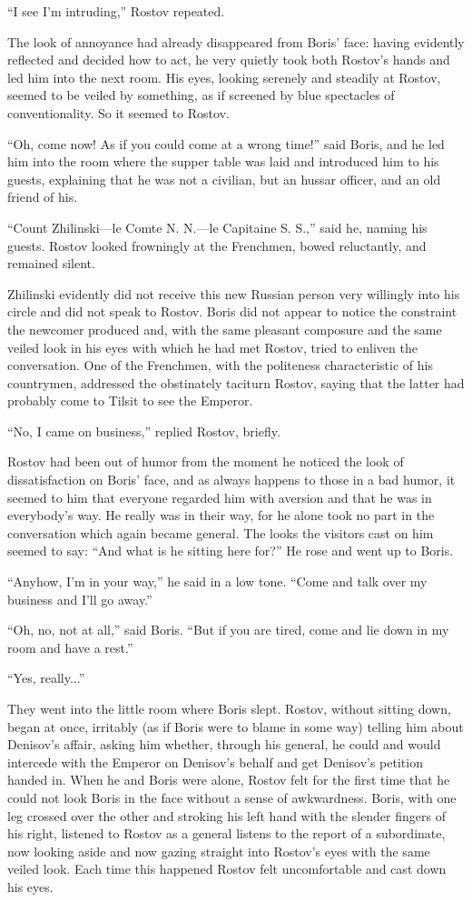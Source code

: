 ``I see I'm intruding,'' Rostov repeated.

The look of annoyance had already disappeared from Boris' face:
having evidently reflected and decided how to act, he very
quietly took both Rostov's hands and led him into the next
room. His eyes, looking serenely and steadily at Rostov, seemed
to be veiled by something, as if screened by blue spectacles of
conventionality. So it seemed to Rostov.

``Oh, come now! As if you could come at a wrong time!'' said
Boris, and he led him into the room where the supper table was
laid and introduced him to his guests, explaining that he was not
a civilian, but an hussar officer, and an old friend of his.

``Count Zhilinski---le Comte N. N.---le Capitaine S. S.,'' said
he, naming his guests. Rostov looked frowningly at the Frenchmen,
bowed reluctantly, and remained silent.

Zhilinski evidently did not receive this new Russian person very
willingly into his circle and did not speak to Rostov. Boris did
not appear to notice the constraint the newcomer produced and,
with the same pleasant composure and the same veiled look in his
eyes with which he had met Rostov, tried to enliven the
conversation. One of the Frenchmen, with the politeness
characteristic of his countrymen, addressed the obstinately
taciturn Rostov, saying that the latter had probably come to
Tilsit to see the Emperor.

``No, I came on business,'' replied Rostov, briefly.

Rostov had been out of humor from the moment he noticed the look
of dissatisfaction on Boris' face, and as always happens to those
in a bad humor, it seemed to him that everyone regarded him with
aversion and that he was in everybody's way. He really was in
their way, for he alone took no part in the conversation which
again became general. The looks the visitors cast on him seemed
to say: ``And what is he sitting here for?'' He rose and went up
to Boris.

``Anyhow, I'm in your way,'' he said in a low tone. ``Come and
talk over my business and I'll go away.''

``Oh, no, not at all,'' said Boris. ``But if you are tired, come
and lie down in my room and have a rest.''

``Yes, really...''

They went into the little room where Boris slept. Rostov, without
sitting down, began at once, irritably (as if Boris were to blame
in some way) telling him about Denisov's affair, asking him
whether, through his general, he could and would intercede with
the Emperor on Denisov's behalf and get Denisov's petition handed
in. When he and Boris were alone, Rostov felt for the first time
that he could not look Boris in the face without a sense of
awkwardness. Boris, with one leg crossed over the other and
stroking his left hand with the slender fingers of his right,
listened to Rostov as a general listens to the report of a
subordinate, now looking aside and now gazing straight into
Rostov's eyes with the same veiled look. Each time this happened
Rostov felt uncomfortable and cast down his eyes.

